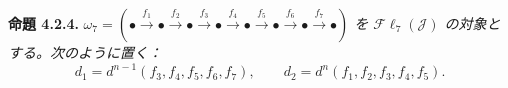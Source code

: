 \medskip\noindent\textbf{命題 4.2.4.}\quad
\textit{
$\omega_7=(\mathord\bullet\xrightarrow{f_1}\mathord\bullet
\xrightarrow{f_2}\mathord\bullet\xrightarrow{f_3}\mathord\bullet
\xrightarrow{f_4}\mathord\bullet\xrightarrow{f_5}\mathord\bullet
\xrightarrow{f_6}\mathord\bullet\xrightarrow{f_7}\mathord\bullet)$
を $\mathcal{F}\ell_7(\mathcal J)$ の対象とする。次のように置く：}
\[
d_1=d^{n-1}(f_3,f_4,f_5,f_6,f_7),
\qquad
d_2=d^n(f_1,f_2,f_3,f_4,f_5).
\]
\endgroup
